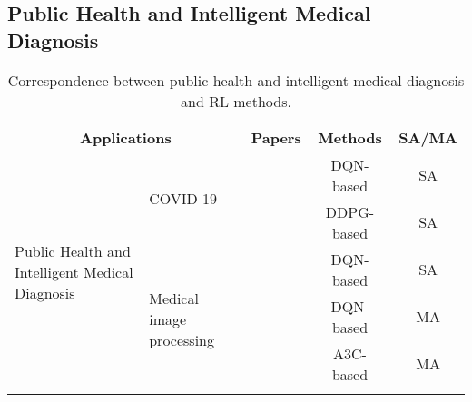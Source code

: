\documentclass[acmsmall]{acmart}
\begin{document}
\subsection{Public Health and Intelligent Medical Diagnosis}

\begin{table}[]
\centering
\caption{Correspondence between public health and intelligent medical diagnosis and RL methods.}
\label{health}
\begin{tabularx}{\textwidth}{|XX|c|c|c|}
\hline
\multicolumn{2}{|c|}{Applications}                                                                                                          & Papers                                                                                                                   & Methods                & SA/MA \\ \hline
\multicolumn{1}{|X|}{\multirow{8}{=}{\centering Public Health and Intelligent Medical Diagnosis}} & \multirow{2}{=}{\centering COVID-19} & \cite{9551174,   Khalilpourazari2022,10.3389/fpubh.2021.744100}                                                          & DQN-based \cite{dqn}   & SA       \\ \cline{3-5} 
\multicolumn{1}{|X|}{}                                                                 &                                                    & \cite{Zheng2021}                                                                                                         & DDPG-based \cite{ddpg} & SA       \\ \cline{2-5} 
\multicolumn{1}{|X|}{}                                                                 & \multirow{4}{=}{\centering Medical image processing}          & \cite{JALALI2021107675,9855449}                                                                                          & DQN-based \cite{dqn}   & SA       \\ \cline{3-5} 
\multicolumn{1}{|X|}{}                                                                 &                                                    & \cite{jpm12020309,zheng2021multi,10.1007/978-3-030-32251-9_29,10.1007/978-3-030-66843-3_18,10.1007/978-3-030-32251-9_29} & DQN-based \cite{dqn}   & MA       \\ \cline{3-5} 
\multicolumn{1}{|X|}{}                                                                 &                                                    & \cite{Liao_2020_CVPR,9311659}                                                                                            & A3C-based \cite{a3c}   & MA       \\ \cline{3-5} 

\end{tabularx}
\end{table}
\end{document}
